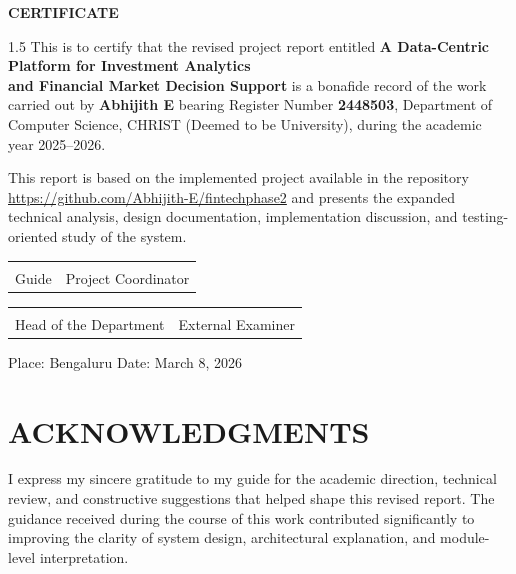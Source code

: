 \documentclass[12pt,a4paper]{report}
\newcommand{\projecttitle}{A Data-Centric Platform for Investment Analytics\\and Financial Market Decision Support}
\newcommand{\studentname}{Abhijith E}
\newcommand{\regno}{2448503}
\newcommand{\reportdate}{March 8, 2026}
\newcommand{\repolink}{https://github.com/Abhijith-E/fintechphase2}
\begin{document}
\begin{titlepage}
\thispagestyle{empty}
\centering
\vspace*{0.7in}
{\fontsize{16}{18}\selectfont\bfseries CERTIFICATE\par}
\vspace{0.5in}
\begin{spacing}{1.5}
\noindent This is to certify that the revised project report entitled \textbf{\projecttitle} is a bonafide record of the work carried out by \textbf{\studentname} bearing Register Number \textbf{\regno}, Department of Computer Science, CHRIST (Deemed to be University), during the academic year 2025--2026.

\vspace{0.22in}
\noindent This report is based on the implemented project available in the repository \url{\repolink} and presents the expanded technical analysis, design documentation, implementation discussion, and testing-oriented study of the system.
\end{spacing}

\vspace{1.55in}
\begin{tabular}{p{2.4in} p{2.4in}}
\centering\hrulefill & \centering\hrulefill \tabularnewline
\centering Guide & \centering Project Coordinator \tabularnewline
\end{tabular}

\vspace{1.05in}
\begin{tabular}{p{2.4in} p{2.4in}}
\centering\hrulefill & \centering\hrulefill \tabularnewline
\centering Head of the Department & \centering External Examiner \tabularnewline
\end{tabular}

\vfill
\noindent Place: Bengaluru \hfill Date: \reportdate
\end{titlepage}

\setcounter{page}{3}
\pagestyle{reportstyle}

\chapter*{ACKNOWLEDGMENTS}
I express my sincere gratitude to my guide for the academic direction, technical review, and constructive suggestions that helped shape this revised report. The guidance received during the course of this work contributed significantly to improving the clarity of system design, architectural explanation, and module-level interpretation.
\end{document}

